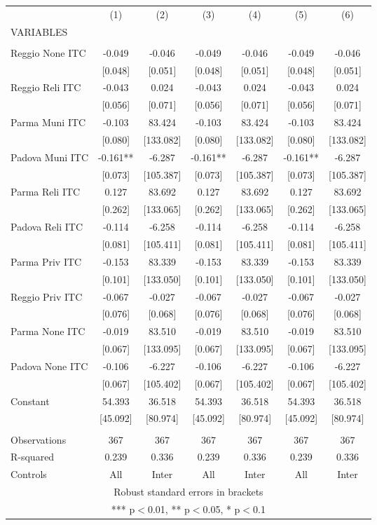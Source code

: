 \begin{tabular}{lcccccc} \hline
 & (1) & (2) & (3) & (4) & (5) & (6) \\
VARIABLES &  &  &  &  &  &  \\ \hline
 &  &  &  &  &  &  \\
Reggio None ITC & -0.049 & -0.046 & -0.049 & -0.046 & -0.049 & -0.046 \\
 & [0.048] & [0.051] & [0.048] & [0.051] & [0.048] & [0.051] \\
Reggio Reli ITC & -0.043 & 0.024 & -0.043 & 0.024 & -0.043 & 0.024 \\
 & [0.056] & [0.071] & [0.056] & [0.071] & [0.056] & [0.071] \\
Parma Muni ITC & -0.103 & 83.424 & -0.103 & 83.424 & -0.103 & 83.424 \\
 & [0.080] & [133.082] & [0.080] & [133.082] & [0.080] & [133.082] \\
Padova Muni ITC & -0.161** & -6.287 & -0.161** & -6.287 & -0.161** & -6.287 \\
 & [0.073] & [105.387] & [0.073] & [105.387] & [0.073] & [105.387] \\
Parma Reli ITC & 0.127 & 83.692 & 0.127 & 83.692 & 0.127 & 83.692 \\
 & [0.262] & [133.065] & [0.262] & [133.065] & [0.262] & [133.065] \\
Padova Reli ITC & -0.114 & -6.258 & -0.114 & -6.258 & -0.114 & -6.258 \\
 & [0.081] & [105.411] & [0.081] & [105.411] & [0.081] & [105.411] \\
Parma Priv ITC & -0.153 & 83.339 & -0.153 & 83.339 & -0.153 & 83.339 \\
 & [0.101] & [133.050] & [0.101] & [133.050] & [0.101] & [133.050] \\
Reggio Priv ITC & -0.067 & -0.027 & -0.067 & -0.027 & -0.067 & -0.027 \\
 & [0.076] & [0.068] & [0.076] & [0.068] & [0.076] & [0.068] \\
Parma None ITC & -0.019 & 83.510 & -0.019 & 83.510 & -0.019 & 83.510 \\
 & [0.067] & [133.095] & [0.067] & [133.095] & [0.067] & [133.095] \\
Padova None ITC & -0.106 & -6.227 & -0.106 & -6.227 & -0.106 & -6.227 \\
 & [0.067] & [105.402] & [0.067] & [105.402] & [0.067] & [105.402] \\
Constant & 54.393 & 36.518 & 54.393 & 36.518 & 54.393 & 36.518 \\
 & [45.092] & [80.974] & [45.092] & [80.974] & [45.092] & [80.974] \\
 &  &  &  &  &  &  \\
Observations & 367 & 367 & 367 & 367 & 367 & 367 \\
R-squared & 0.239 & 0.336 & 0.239 & 0.336 & 0.239 & 0.336 \\
 Controls & All & Inter & All & Inter & All & Inter \\ \hline
\multicolumn{7}{c}{ Robust standard errors in brackets} \\
\multicolumn{7}{c}{ *** p$<$0.01, ** p$<$0.05, * p$<$0.1} \\
\end{tabular}
